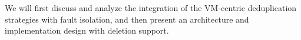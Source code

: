 We will first discuss and analyze the integration of the VM-centric deduplication strategies with fault isolation, 
and then present
an architecture and implementation design with deletion support.

%





